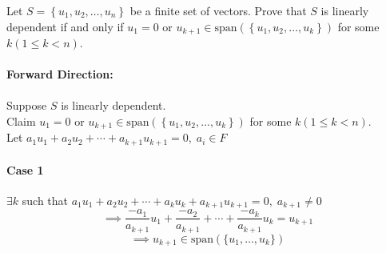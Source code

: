 Let $S = \left\{u_1,u_2,\dots,u_n\right\}$ be a finite set of
vectors. Prove that $S$ is linearly dependent if and only if $u_1 =0$
or $u_{k+1} \in
\text{span}\left(\left\{u_1,u_2,\dots,u_k\right\}\right)$ for some $k
\left(1 \leq k < n\right)$.
\\\hfill\\
\textbf{Forward Direction:}\\
\\Suppose $S$ is linearly dependent.
\\Claim $u_1 =0$
or $u_{k+1} \in
\text{span}\left(\left\{u_1,u_2,\dots,u_k\right\}\right)$ for some $k
\left(1 \leq k < n\right)$.
\\Let $a_1u_1 +a_2u_2 +\cdots+a_{k+1}u_{k+1}=0,\; a_i \in F$
\paragraph{Case 1} $\exists k$ such that $a_1u_1 +a_2u_2
+\cdots+a_ku_k+a_{k+1}u_{k+1}=0,\;a_{k+1} \neq 0$
\begin{equation}
\implies \frac{-a_1}{a_{k+1}}u_1 + \frac{-a_2}{a_{k+1}} +\cdots +
\frac{-a_k}{a_{k+1}}u_k = u_{k+1}
\end{equation}
\begin{equation}
\implies u_{k+1} \in \text{span}(\{u_1,\dots,u_k\})
\end{equation}
